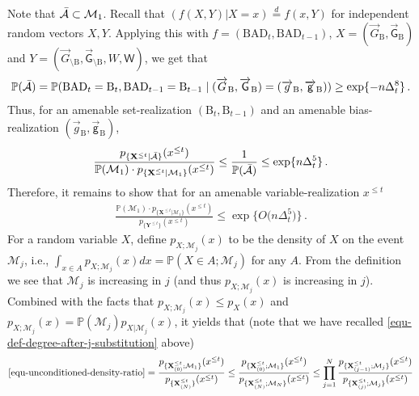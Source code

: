 \documentclass[11pt]{article}
\numberwithin{equation}{section}
\begin{document}
Note that $\Bar{\mathcal{A}} \subset \mathcal{M}_{1}$. Recall that $(f(X,Y)|X=x) \overset{d}{=} f(x,Y)$ for independent random vectors $X,Y$. Applying this with  $f=(\mathrm{BAD}_t,\mathrm{BAD}_{t-1})$, $X=( \overrightarrow{G}_{\mathrm{B}}, \overrightarrow{\mathsf{G}}_{\mathrm{B}} )$ and $Y=( \overrightarrow{G}_{\setminus \mathrm{B}}, \overrightarrow{\mathsf{G}}_{\setminus \mathrm{B}}, W,\mathsf{W} )$, we get that
\begin{align*}
    \mathbb{P}(\Bar{\mathcal{A}}) = \mathbb{P}( \mathrm{BAD}_t = \mathrm{B}_t, \mathrm{BAD}_{t-1} = \mathrm{B}_{t-1} \mid ( \overrightarrow{G}_{\mathrm{B}}, \overrightarrow{\mathsf{G}}_{\mathrm{B}} ) = ( \overrightarrow{g}_{\mathrm{B}}, \overrightarrow{\mathsf{g}}_{\mathrm{B}} ) ) \geq \exp \{ - n \Delta_t^{8} \}\,.
\end{align*}
Thus, for an amenable set-realization $(\mathrm{B}_t, \mathrm{B}_{t-1})$ and an amenable bias-realization $( \overrightarrow{g}_{\mathrm{B}}, \overrightarrow{\mathsf{g}}_{\mathrm{B}} )$, 
\begin{align*}
    \frac{ {p}_{ \{ \mathbf{X}^{\leq t} | \Bar{\mathcal{A}} \} } (x^{\leq t}) }{ \mathbb{P}(\mathcal{M}_1) \cdot {p}_{ \{ \mathbf{X}^{\leq t} | \mathcal{M}_1 \} } (x^{\leq t}) } \leq \frac{ 1 }{ \mathbb{P}( \Bar{\mathcal{A}} ) }
    \leq \exp \{ n \Delta_t^5 \} \,.
\end{align*}
Therefore, it remains to show that for an amenable variable-realization $x^{\leq t}$
\begin{align}
    \frac{ \mathbb{P}( \mathcal{M}_1 ) \cdot {p}_{ \{ \mathbf{X}^{\leq t} | \mathcal{M}_1 \} } (x^{\leq t}) }{  {p}_{ \{ \mathbf{Y}^{\leq t} \} } (x^{\leq t})  } \leq \exp \big\{ O \big( n \Delta_t^5 \big) \big\}\,.
    \label{equ-unconditioned-density-ratio}
\end{align}
For a random variable $X$, define $p_{X;\mathcal{M}_j} (x)$ to be the density of $X$ on the event $\mathcal{M}_j$, i.e., $\int_{ x \in A } p_{X;\mathcal{M}_j} (x) dx = \mathbb{P}( X \in A; \mathcal{M}_j )$ for any $A$. From the definition we see that $\mathcal M_j$ is increasing in $j$ (and thus $p_{X;\mathcal{M}_j} (x)$ is increasing in $j$). Combined with the facts that $p_{X;\mathcal{M}_j} (x) \leq p_{X}(x) $ and $p_{X;\mathcal{M}_j} (x) =\mathbb{P}(\mathcal{M}_j) p_{X|\mathcal{M}_j} (x)$, it yields that (note that we have recalled \eqref{equ-def-degree-after-j-substitution} above)
\begin{align}
    \eqref{equ-unconditioned-density-ratio} = \frac{ p_{ \{ \mathbf{X}^{\leq t}_{(0)} ; \mathcal{M}_1 \} } (x^{\leq t}) }{ {p}_{ \{ \mathbf{X}^{\leq t}_{(N)} \} } (x^{\leq t}) } \leq \frac{ p_{ \{ \mathbf{X}^{\leq t}_{(0)} ; \mathcal{M}_1 \} } (x^{\leq t}) }{  {p}_{ \{ \mathbf{X}^{\leq t}_{(N)} ; \mathcal{M}_N \} } (x^{\leq t})  } \leq \prod_{j=1}^{N} \frac{ {p}_{ \{ \mathbf{X}^{\leq t}_{(j-1)} ; \mathcal{M}_j \} } (x^{\leq t}) }{  {p}_{ \{ \mathbf{X}^{\leq t}_{(j)} ; \mathcal{M}_j \} } (x^{\leq t}) }
\end{align}
\end{document}
